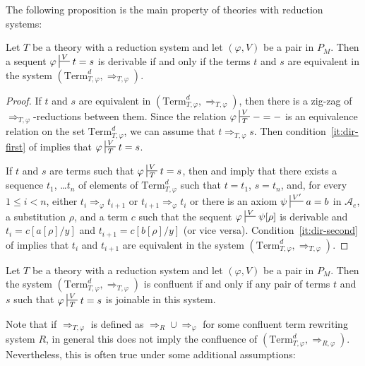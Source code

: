 \documentclass[reqno]{amsart}
\theoremstyle{definition}
\theoremstyle{remark}
\newcommand{\Term}{\mathrm{Term}}
\numberwithin{figure}{section}
\begin{document}
The following proposition is the main property of theories with reduction systems:

\begin{prop}
Let $T$ be a theory with a reduction system and let $(\varphi,V)$ be a pair in $P_M$.
Then a sequent $\varphi \sststile{}{V} t = s$ is derivable if and only if the terms $t$ and $s$ are equivalent in the system $(\Term_{T,\varphi}^d,\Rightarrow_{T,\varphi})$.
\end{prop}
\begin{proof}
If $t$ and $s$ are equivalent in $(\Term_{T,\varphi}^d,\Rightarrow_{T,\varphi})$, then there is a zig-zag of $\Rightarrow_{T,\varphi}$-reductions between them.
Since the relation $\varphi \sststile{T}{V} - = -$ is an equivalence relation on the set $\Term_{T,\varphi}^d$, we can assume that $t \Rightarrow_{T,\varphi} s$.
Then condition~\eqref{it:dir-first} of  implies that $\varphi \sststile{T}{V} t = s$.

If $t$ and $s$ are terms such that $\varphi \sststile{T}{V} t = s$, then  and  imply that
there exists a sequence $t_1$, \ldots $t_n$ of elements of $\Term^d_{T,\varphi}$ such that $t = t_1$, $s = t_n$, and, for every $1 \leq i < n$,
either $t_i \Rightarrow_\varphi t_{i+1}$ or $t_{i+1} \Rightarrow_\varphi t_i$ or there is an axiom $\psi \sststile{}{V'} a = b$ in $\mathcal{A}_e$, a substitution $\rho$, and a term $c$ such that
the sequent $\varphi \sststile{}{V} \psi[\rho]$ is derivable and $t_i = c[a[\rho]/y]$ and $t_{i+1} = c[b[\rho]/y]$ (or vice versa).
Condition~\eqref{it:dir-second} of  implies that $t_i$ and $t_{i+1}$ are equivalent in the system $(\Term_{T,\varphi}^d,\Rightarrow_{T,\varphi})$.
\end{proof}

\begin{cor}
Let $T$ be a theory with a reduction system and let $(\varphi,V)$ be a pair in $P_M$.
Then the system $(\Term_{T,\varphi}^d,\Rightarrow_{T,\varphi})$ is confluent if and only if any pair of terms $t$ and $s$ such that $\varphi \sststile{T}{V} t = s$ is joinable in this system.
\end{cor}

Note that if $\Rightarrow_{T,\varphi}$ is defined as $\Rightarrow_R \cup \Rightarrow_\varphi$ for some confluent term rewriting system $R$,
in general this does not imply the confluence of $(\Term_{T,\varphi}^d,\Rightarrow_{R,\varphi})$.
Nevertheless, this is often true under some additional assumptions:
\end{document}
